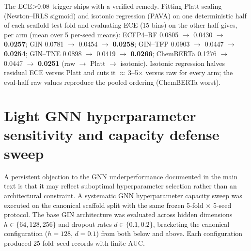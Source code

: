 \documentclass[11pt,a4paper]{article}
\begin{document}
The $\mathrm{ECE} \num{>0.08}$ trigger ships with a verified remedy. Fitting Platt scaling (Newton--IRLS sigmoid) and isotonic regression (PAVA) on one deterministic half of each scaffold test fold and evaluating ECE (\num{15} bins) on the other half gives, per arm (mean over \num{5} per-seed means): ECFP4--RF \num{0.0805} $\rightarrow$ \num{0.0430} $\rightarrow$ \textbf{\num{0.0257}}; GIN \num{0.0781} $\rightarrow$ \num{0.0454} $\rightarrow$ \textbf{\num{0.0258}}; GIN--TFP \num{0.0903} $\rightarrow$ \num{0.0447} $\rightarrow$ \textbf{\num{0.0254}}; GIN--TNE \num{0.0898} $\rightarrow$ \num{0.0419} $\rightarrow$ \textbf{\num{0.0266}}; ChemBERTa \num{0.1276} $\rightarrow$ \num{0.0447} $\rightarrow$ \textbf{\num{0.0251}} (raw $\rightarrow$ Platt $\rightarrow$ isotonic). Isotonic regression halves residual ECE versus Platt and cuts it $\approx$\,\numrange{3}{5}$\times$ versus raw for every arm; the eval-half raw values reproduce the pooled ordering (ChemBERTa worst).

\section{Light GNN hyperparameter sensitivity and capacity defense sweep}
\label{sec:gnn_sensitivity_si}

A persistent objection to the GNN underperformance documented in the main text is that it may reflect suboptimal hyperparameter selection rather than an architectural constraint. A systematic GNN hyperparameter capacity sweep was executed on the canonical scaffold split with the same frozen \num{5}-fold $\times$ \num{5}-seed protocol. The base GIN architecture \citep{xu2019gin} was evaluated across hidden dimensions $h \in \{\num{64}, \num{128}, \num{256}\}$ and dropout rates $d \in \{\num{0.1}, \num{0.2}\}$, bracketing the canonical configuration ($h=\num{128}$, $d=\num{0.1}$) from both below and above. Each configuration produced \num{25} fold--seed records with finite AUC.
\end{document}
